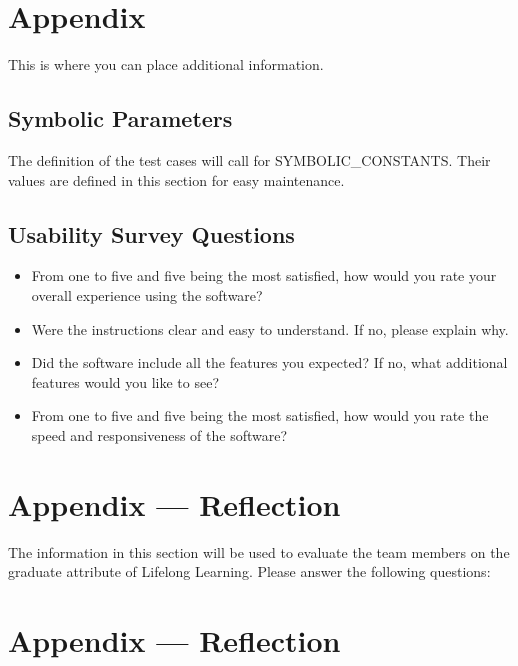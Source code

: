 \documentclass[12pt, titlepage]{article}
\begin{document}
\newpage

\section{Appendix}

This is where you can place additional information.

\subsection{Symbolic Parameters}

The definition of the test cases will call for SYMBOLIC\_CONSTANTS.
Their values are defined in this section for easy maintenance.

\subsection{Usability Survey Questions}\label{USQ}
\begin{itemize}
\item From one to five and five being the most satisfied, how would you rate your overall experience using the software?
\item Were the instructions clear and easy to understand. If no, please explain why.
\item Did the software include all the features you expected? If no, what additional features would you like to see?
\item From one to five and five being the most satisfied, how would you rate the speed and responsiveness of the software?
\end{itemize}



\newpage{}
\section*{Appendix --- Reflection}

The information in this section will be used to evaluate the team members on the
graduate attribute of Lifelong Learning.  Please answer the following questions:

\newpage{}
\section*{Appendix --- Reflection}

\end{document}
